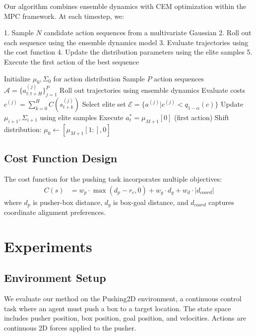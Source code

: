 \documentclass[10pt,twocolumn,letterpaper]{article}
\begin{document}
Our algorithm combines ensemble dynamics with CEM optimization within the MPC framework. At each timestep, we:

1. Sample $N$ candidate action sequences from a multivariate Gaussian
2. Roll out each sequence using the ensemble dynamics model
3. Evaluate trajectories using the cost function
4. Update the distribution parameters using the elite samples
5. Execute the first action of the best sequence

\begin{algorithm}
\caption{CEM-MPC with Ensemble Dynamics}
\begin{algorithmic}[1]
\STATE Initialize $\mu_0, \Sigma_0$ for action distribution
        \STATE Sample $P$ action sequences $\mathcal{A} = \{a_{t:t+H}^{(j)}\}_{j=1}^P$
        \STATE Roll out trajectories using ensemble dynamics
        \STATE Evaluate costs $c^{(j)} = \sum_{k=0}^H C(s_{t+k}^{(j)})$
        \STATE Select elite set $\mathcal{E} = \{a^{(j)} | c^{(j)} < q_{1-\alpha}(c)\}$
        \STATE Update $\mu_{i+1}, \Sigma_{i+1}$ using elite samples
    \ENDFOR
    \STATE Execute $a_t^* = \mu_{M+1}[0]$ (first action)
    \STATE Shift distribution: $\mu_0 \leftarrow [\mu_{M+1}[1:], 0]$
\ENDFOR
\end{algorithmic}
\end{algorithm}

\subsection{Cost Function Design}

The cost function for the pushing task incorporates multiple objectives:
\begin{align}
C(s) &= w_p \cdot \max(d_p - r_c, 0) + w_g \cdot d_g + w_d \cdot |d_{coord}|
\end{align}
where $d_p$ is pusher-box distance, $d_g$ is box-goal distance, and $d_{coord}$ captures coordinate alignment preferences.

\section{Experiments}

\subsection{Environment Setup}

We evaluate our method on the Pushing2D environment, a continuous control task where an agent must push a box to a target location. The state space includes pusher position, box position, goal position, and velocities. Actions are continuous 2D forces applied to the pusher.
\end{document}
